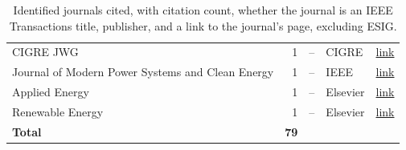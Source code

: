 \begin{table}[htbp]
\begin{tabular}{lrcll}
    CIGRE JWG & 1 & -- & CIGRE & \href{https://www.cigre.org/GB/publications/electra}{link} \\
    Journal of Modern Power Systems and Clean Energy & 1 & -- & IEEE & \href{https://www.mpce.info/}{link} \\
    Applied Energy & 1 & -- & Elsevier & \href{https://www.sciencedirect.com/journal/applied-energy}{link} \\
    Renewable Energy & 1 & -- & Elsevier & \href{https://www.sciencedirect.com/journal/renewable-energy}{link} \\
\midrule
    \textbf{Total} & \textbf{79} & & & \\
\bottomrule
\end{tabular}
\caption{Identified journals cited, with citation count, whether the journal is an IEEE Transactions title, publisher, and a link to the journal's page, excluding ESIG.}
\label{tab:journal_publishers_no_esig}
\end{table}
